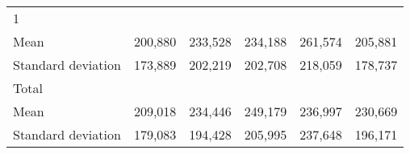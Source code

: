\begin{tabular}{llllll}
\multicolumn{1}{l}{\hspace{3em}1} &
  \multicolumn{1}{|r}{} &
  \multicolumn{1}{r}{} &
  \multicolumn{1}{r}{} &
  \multicolumn{1}{r}{} &
  \multicolumn{1}{r}{} \\
\multicolumn{1}{l}{\hspace{4em}Mean} &
  \multicolumn{1}{|r}{200,880} &
  \multicolumn{1}{r}{233,528} &
  \multicolumn{1}{r}{234,188} &
  \multicolumn{1}{r}{261,574} &
  \multicolumn{1}{r}{205,881} \\
\multicolumn{1}{l}{\hspace{4em}Standard deviation} &
  \multicolumn{1}{|r}{173,889} &
  \multicolumn{1}{r}{202,219} &
  \multicolumn{1}{r}{202,708} &
  \multicolumn{1}{r}{218,059} &
  \multicolumn{1}{r}{178,737} \\
\multicolumn{1}{l}{\hspace{3em}Total} &
  \multicolumn{1}{|r}{} &
  \multicolumn{1}{r}{} &
  \multicolumn{1}{r}{} &
  \multicolumn{1}{r}{} &
  \multicolumn{1}{r}{} \\
\multicolumn{1}{l}{\hspace{4em}Mean} &
  \multicolumn{1}{|r}{209,018} &
  \multicolumn{1}{r}{234,446} &
  \multicolumn{1}{r}{249,179} &
  \multicolumn{1}{r}{236,997} &
  \multicolumn{1}{r}{230,669} \\
\multicolumn{1}{l}{\hspace{4em}Standard deviation} &
  \multicolumn{1}{|r}{179,083} &
  \multicolumn{1}{r}{194,428} &
  \multicolumn{1}{r}{205,995} &
  \multicolumn{1}{r}{237,648} &
  \multicolumn{1}{r}{196,171} \\
\cline{1-6}
\end{tabular}


